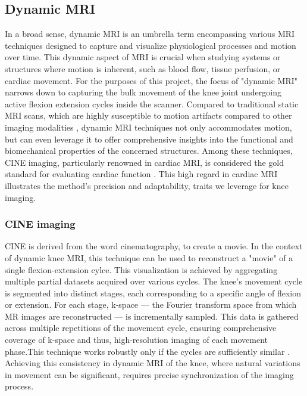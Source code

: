 \documentclass{micro-econ-thesis}
\begin{document}
\subsection{Dynamic MRI}
In a broad sense, dynamic MRI is an umbrella term encompassing various MRI techniques designed to capture and visualize physiological processes and motion over time. This dynamic aspect of MRI is crucial when studying systems or structures where motion is inherent, such as blood flow, tissue perfusion, or cardiac movement. For the purposes of this project, the focus of "dynamic MRI" narrows down to capturing the bulk movement of the knee joint undergoing active flexion extension cycles inside the scanner. Compared to traditional static MRI scans, which are highly susceptible to motion artifacts compared to other imaging modalities \parencite{zaitsev_motion_2015}, dynamic MRI techniques not only accommodates motion, but can even leverage it to offer comprehensive insights into the functional and biomechanical properties of the concerned structures.  Among these techniques, CINE imaging, particularly renowned in cardiac MRI, is considered the gold standard for evaluating cardiac function \parencite{menchon-lara_reconstruction_2019}. This high regard in cardiac MRI illustrates the method's precision and adaptability, traits we leverage for knee imaging.

\subsubsection{CINE imaging}

CINE is derived from the word cinematography, to create a movie. In the context of dynamic knee MRI, this technique can be used to reconstruct a "movie" of a single flexion-extension cylce. This visualization is achieved by aggregating multiple partial datasets acquired over various cycles. The knee's movement cycle is segmented into distinct stages, each corresponding to a specific angle of flexion or extension. For each stage, k-space — the Fourier transform space from which MR images are reconstructed — is incrementally sampled. This data is gathered across multiple repetitions of the movement cycle, ensuring comprehensive coverage of k-space and thus, high-resolution imaging of each movement phase.This technique works robustly only if the cycles are sufficiently similar \parencite{curtis_primer_2022}. Achieving this consistency in dynamic MRI of the knee, where natural variations in movement can be significant, requires precise synchronization of the imaging process.
\end{document}
